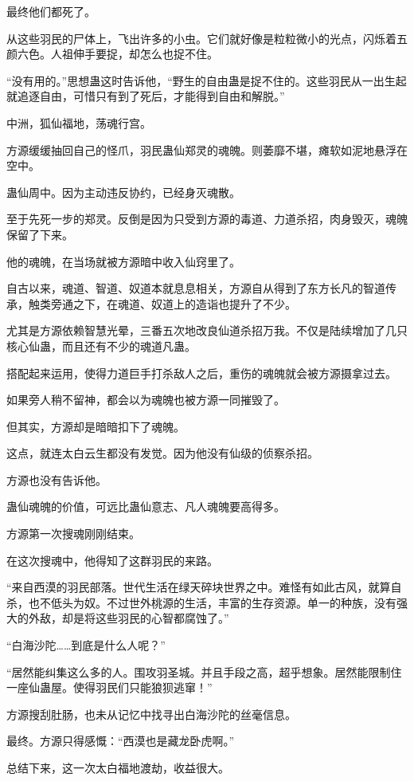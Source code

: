 \begin{this_body}
最终他们都死了。

从这些羽民的尸体上，飞出许多的小虫。它们就好像是粒粒微小的光点，闪烁着五颜六色。人祖伸手要捉，却怎么也捉不住。

“没有用的。”思想蛊这时告诉他，“野生的自由蛊是捉不住的。这些羽民从一出生起就追逐自由，可惜只有到了死后，才能得到自由和解脱。”

中洲，狐仙福地，荡魂行宫。

方源缓缓抽回自己的怪爪，羽民蛊仙郑灵的魂魄。则萎靡不堪，瘫软如泥地悬浮在空中。

蛊仙周中。因为主动违反协约，已经身灭魂散。

至于先死一步的郑灵。反倒是因为只受到方源的毒道、力道杀招，肉身毁灭，魂魄保留了下来。

他的魂魄，在当场就被方源暗中收入仙窍里了。

自古以来，魂道、智道、奴道本就息息相关，方源自从得到了东方长凡的智道传承，触类旁通之下，在魂道、奴道上的造诣也提升了不少。

尤其是方源依赖智慧光晕，三番五次地改良仙道杀招万我。不仅是陆续增加了几只核心仙蛊，而且还有不少的魂道凡蛊。

搭配起来运用，使得力道巨手打杀敌人之后，重伤的魂魄就会被方源摄拿过去。

如果旁人稍不留神，都会以为魂魄也被方源一同摧毁了。

但其实，方源却是暗暗扣下了魂魄。

这点，就连太白云生都没有发觉。因为他没有仙级的侦察杀招。

方源也没有告诉他。

蛊仙魂魄的价值，可远比蛊仙意志、凡人魂魄要高得多。

方源第一次搜魂刚刚结束。

在这次搜魂中，他得知了这群羽民的来路。

“来自西漠的羽民部落。世代生活在绿天碎块世界之中。难怪有如此古风，就算自杀，也不低头为奴。不过世外桃源的生活，丰富的生存资源。单一的种族，没有强大的外敌，却是将这些羽民的心智都腐蚀了。”

“白海沙陀……到底是什么人呢？”

“居然能纠集这么多的人。围攻羽圣城。并且手段之高，超乎想象。居然能限制住一座仙蛊屋。使得羽民们只能狼狈逃窜！”

方源搜刮肚肠，也未从记忆中找寻出白海沙陀的丝毫信息。

最终。方源只得感慨：“西漠也是藏龙卧虎啊。”

总结下来，这一次太白福地渡劫，收益很大。


\end{this_body}
